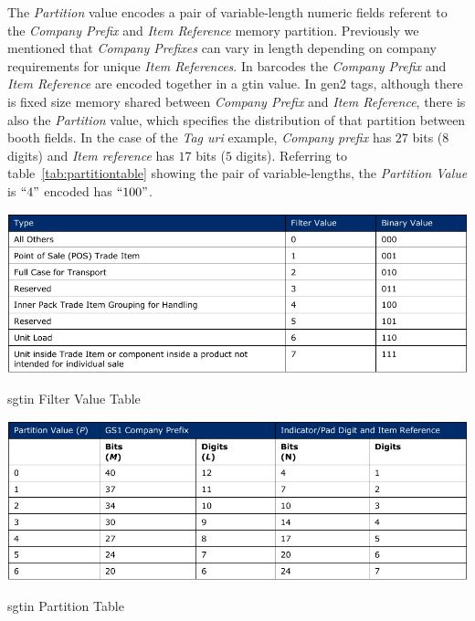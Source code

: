 The \emph{Partition} value encodes a pair of variable-length numeric fields referent to the \emph{Company Prefix} and \emph{Item Reference} memory partition. Previously we mentioned that \emph{Company Prefixes} can vary in length depending on company requirements for unique \emph{Item References}. 
In barcodes the \emph{Company Prefix} and \emph{Item Reference} are encoded together in a \ac{gtin} value. 
In \ac{gen2} tags, although there is fixed size memory shared between \emph{Company Prefix} and \emph{Item Reference}, there is also the \emph{Partition} value, which specifies the distribution of that partition between booth fields.
In the case of the \emph{Tag \ac{uri}} example, \emph{Company prefix} has $27$ bits ($8$ digits) and \emph{Item reference} has $17$ bits ($5$ digits). Referring to table~\ref{tab:partitiontable} showing the pair of variable-lengths, the \emph{Partition Value} is $``4"$ encoded has $``100"$.

\begin{table}[]
    \centering
    \includegraphics[width=\textwidth]{./figs/02-state-of-the-art/table_sgtin_filtervalues.pdf}
    \caption[\ac{sgtin} Filter Value Table]{\ac{sgtin} Filter Value Table~\cite{EPCTagData}} 
    \label{tab:sgtinfiltervalues}
\end{table}

\begin{table}[]
    \centering
    \includegraphics[width=\textwidth]{./figs/02-state-of-the-art/table_partitionvalues.pdf}
    \caption[\ac{sgtin} Partition Table]{\ac{sgtin} Partition Table~\cite{EPCTagData}} 
    \label{tab:partitiontable}
\end{table}

